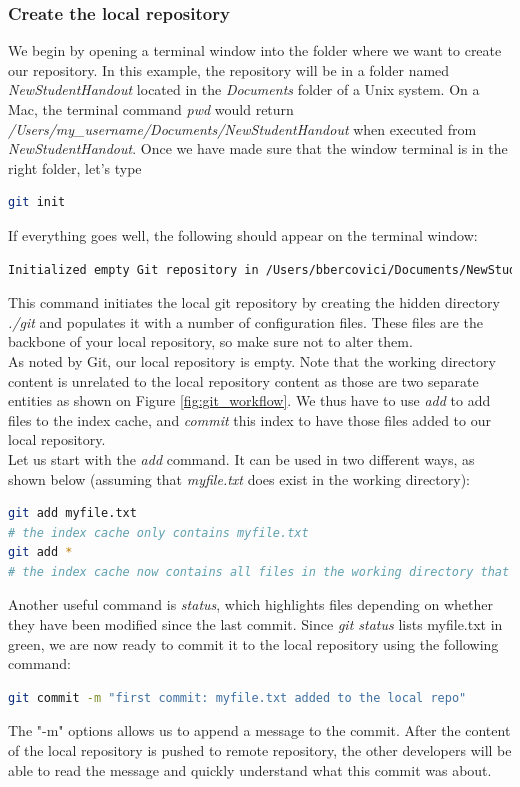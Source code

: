\subsubsection{Create the local repository}
We begin by opening a terminal window into the folder where we want to create our repository. In this example, the repository will be in a folder named \textit{NewStudentHandout} located in the \textit{Documents} folder of a Unix system. On a Mac, the terminal command \textit{pwd} would return 
\textit{/Users/my\_username/Documents/NewStudentHandout} when executed from \textit{NewStudentHandout}. Once we have made sure that the window terminal is in the right folder, let's type
\begin{lstlisting}[language=bash, caption=Creation of the local repository]
git init
\end{lstlisting}
If everything goes well, the following should appear on the terminal window:
\begin{lstlisting}[language=bash, caption=Successful git init message ]
Initialized empty Git repository in /Users/bbercovici/Documents/NewStudentHandout/.git/
\end{lstlisting}
This command initiates the local git repository by creating the hidden directory \textit{./git} and populates it with a number of configuration files. These files are the backbone of your local repository, so make sure not to alter them.\\
As noted by Git, our local repository is empty. Note that the working directory content is unrelated to the local repository content as those are two separate entities as shown on Figure \ref{fig:git_workflow}. We thus have to use \textit{add} to add files to the index cache, and \textit{commit} this index to have those files added to our local repository.\\
Let us start with the \textit{add} command. It can be used in two different ways, as shown below (assuming that \textit{myfile.txt} does exist in the working directory):
\begin{lstlisting}[language=bash, caption=Add files to the cache ]
git add myfile.txt
# the index cache only contains myfile.txt
git add *
# the index cache now contains all files in the working directory that were not excluded in .gitignore 
\end{lstlisting}
Another useful command is \textit{status}, which highlights files depending on whether they have been modified since the last commit. Since \textit{git status} lists myfile.txt in green, we are now ready to commit it to the local repository using the following command:
\begin{lstlisting}[language=bash, caption=commit files to the local repository ]
git commit -m "first commit: myfile.txt added to the local repo"
\end{lstlisting}
The "-m" options allows us to append a message to the commit. After the content of the local repository is pushed to remote repository, the other developers will be able to read the message and quickly understand what this commit was about.


